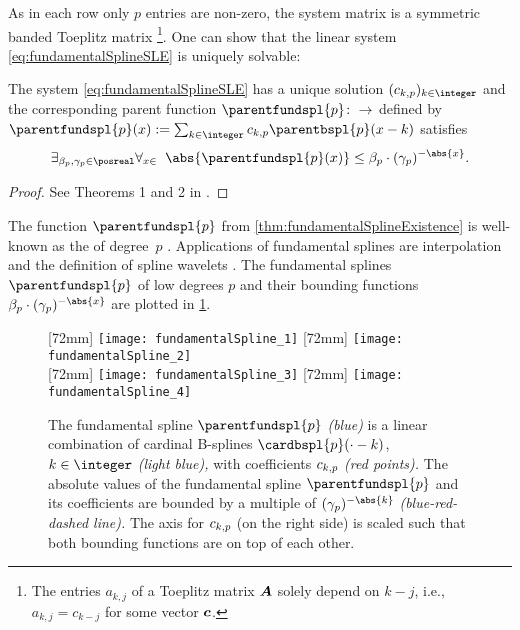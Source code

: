 As in each row only $p$ entries are non-zero,
the system matrix is a symmetric banded Toeplitz matrix%
\footnote{%
  The entries $a_{k,j}$ of a Toeplitz matrix ${\boldsymbol{A}}$
  solely depend on $k - j$, i.e.,
  $a_{k,j} = c_{k-j}$ for some vector ${\boldsymbol{c}}$.%
}.
One can show that the linear system \eqref{eq:fundamentalSplineSLE}
is uniquely solvable:

\begin{theorem}
  \label{thm:fundamentalSplineExistence}
  The system \eqref{eq:fundamentalSplineSLE} has a unique solution
  $(\fundsplcoeff{k}{p})_{k \in \integer}$ and the corresponding parent function
  $\parentfundspl{p}\colon \real \to \real$ defined by
  $\parentfundspl{p}(x) :=
  \sum_{k \in \integer} \fundsplcoeff{k}{p} \parentbspl{p}(x - k)$
  satisfies
  \begin{equation}
    \exfalarge{\beta_p, \gamma_p \in \posreal}{x \in \real}{
      \abs{\parentfundspl{p}(x)}
      \le \beta_p \cdot (\gamma_p)^{-\abs{x}}.
    }
  \end{equation}
\end{theorem}

\begin{proof}
  See Theorems 1 and 2 in \cite{Schoenberg72Cardinal}.
\end{proof}

The function $\parentfundspl{p}$ from \cref{thm:fundamentalSplineExistence}
is well-known as the  of degree~$p$
.
Applications of fundamental splines are interpolation and
the definition of spline wavelets \cite{Chui92Introduction}.
The fundamental splines $\parentfundspl{p}$ of low degrees $p$ and
their bounding functions $\beta_p \cdot (\gamma_p)^{-\abs{x}}$
are plotted in \cref{fig:fundamentalSpline}.

\begin{figure}
  [72mm]{%
    \texttt{[image: fundamentalSpline\_1]}%
  }%
  \hfill%
  [72mm]{%
    \texttt{[image: fundamentalSpline\_2]}%
  }\\[4mm]%
  [72mm]{%
    \texttt{[image: fundamentalSpline\_3]}%
  }%
  \hfill%
  [72mm]{%
    \texttt{[image: fundamentalSpline\_4]}%
  }%
  \caption[%
    Fundamental splines and their B-spline coefficients%
  ]{%
    The fundamental spline $\parentfundspl{p}$ \emph{\textcolor{C0}{(blue)}}
    is a linear combination of cardinal B-splines $\cardbspl{p}({\cdot} - k)$,
    $k \in \integer$ \emph{\textcolor{C0!50}{(light blue)},}
    with coefficients $\fundsplcoeff{k}{p}$ \emph{\textcolor{C1}{(red points)}.}
    The absolute values of the fundamental spline $\parentfundspl{p}$ and
    its coefficients are bounded by a multiple of $(\gamma_p)^{-\abs{k}}$
    \emph{(\textcolor{C0}{blue}-\textcolor{C1}{red}-dashed line).}
    The axis for $\fundsplcoeff{k}{p}$ (on the right side) is scaled such that
    both bounding functions are on top of each other.%
  }%
  \label{fig:fundamentalSpline}%
\end{figure}

